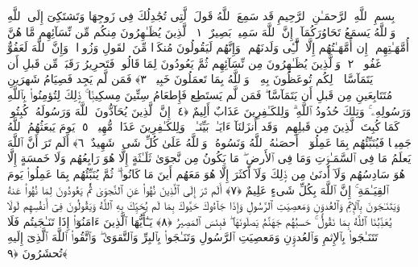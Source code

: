 
  
    
  
    
    

\nopagebreak
  بِسمِ ٱللَّهِ ٱلرَّحمَـٰنِ ٱلرَّحِيمِ
  قَد سَمِعَ ٱللَّهُ قَولَ ٱلَّتِى تُجَٰدِلُكَ فِى زَوجِهَا وَتَشتَكِىٓ إِلَى ٱللَّهِ وَٱللَّهُ يَسمَعُ تَحَاوُرَكُمَآ ۚ إِنَّ ٱللَّهَ سَمِيعٌۢ بَصِيرٌ ﴿١﴾
 ٱلَّذِينَ يُظَـٰهِرُونَ مِنكُم مِّن نِّسَآئِهِم مَّا هُنَّ أُمَّهَـٰتِهِم ۖ إِن أُمَّهَـٰتُهُم إِلَّا ٱلَّٰٓـِٔى وَلَدنَهُم ۚ وَإِنَّهُم لَيَقُولُونَ مُنكَرًۭا مِّنَ ٱلقَولِ وَزُورًۭا ۚ وَإِنَّ ٱللَّهَ لَعَفُوٌّ غَفُورٌۭ ﴿٢﴾
 وَٱلَّذِينَ يُظَـٰهِرُونَ مِن نِّسَآئِهِم ثُمَّ يَعُودُونَ لِمَا قَالُوا۟ فَتَحرِيرُ رَقَبَةٍۢ مِّن قَبلِ أَن يَتَمَآسَّا ۚ ذَٟلِكُم تُوعَظُونَ بِهِۦ ۚ وَٱللَّهُ بِمَا تَعمَلُونَ خَبِيرٌۭ ﴿٣﴾
 فَمَن لَّم يَجِد فَصِيَامُ شَهرَينِ مُتَتَابِعَينِ مِن قَبلِ أَن يَتَمَآسَّا ۖ فَمَن لَّم يَستَطِع فَإِطعَامُ سِتِّينَ مِسكِينًۭا ۚ ذَٟلِكَ لِتُؤمِنُوا۟ بِٱللَّهِ وَرَسُولِهِۦ ۚ وَتِلكَ حُدُودُ ٱللَّهِ ۗ وَلِلكَـٰفِرِينَ عَذَابٌ أَلِيمٌ ﴿٤﴾
 إِنَّ ٱلَّذِينَ يُحَآدُّونَ ٱللَّهَ وَرَسُولَهُۥ كُبِتُوا۟ كَمَا كُبِتَ ٱلَّذِينَ مِن قَبلِهِم ۚ وَقَد أَنزَلنَآ ءَايَـٰتٍۭ بَيِّنَـٰتٍۢ ۚ وَلِلكَـٰفِرِينَ عَذَابٌۭ مُّهِينٌۭ ﴿٥﴾
 يَومَ يَبعَثُهُمُ ٱللَّهُ جَمِيعًۭا فَيُنَبِّئُهُم بِمَا عَمِلُوٓا۟ ۚ أَحصَىٰهُ ٱللَّهُ وَنَسُوهُ ۚ وَٱللَّهُ عَلَىٰ كُلِّ شَىءٍۢ شَهِيدٌ ﴿٦﴾
 أَلَم تَرَ أَنَّ ٱللَّهَ يَعلَمُ مَا فِى ٱلسَّمَـٰوَٟتِ وَمَا فِى ٱلأَرضِ ۖ مَا يَكُونُ مِن نَّجوَىٰ ثَلَـٰثَةٍ إِلَّا هُوَ رَابِعُهُم وَلَا خَمسَةٍ إِلَّا هُوَ سَادِسُهُم وَلَآ أَدنَىٰ مِن ذَٟلِكَ وَلَآ أَكثَرَ إِلَّا هُوَ مَعَهُم أَينَ مَا كَانُوا۟ ۖ ثُمَّ يُنَبِّئُهُم بِمَا عَمِلُوا۟ يَومَ ٱلقِيَـٰمَةِ ۚ إِنَّ ٱللَّهَ بِكُلِّ شَىءٍ عَلِيمٌ ﴿٧﴾
 أَلَم تَرَ إِلَى ٱلَّذِينَ نُهُوا۟ عَنِ ٱلنَّجوَىٰ ثُمَّ يَعُودُونَ لِمَا نُهُوا۟ عَنهُ وَيَتَنَـٰجَونَ بِٱلإِثمِ وَٱلعُدوَٟنِ وَمَعصِيَتِ ٱلرَّسُولِ وَإِذَا جَآءُوكَ حَيَّوكَ بِمَا لَم يُحَيِّكَ بِهِ ٱللَّهُ وَيَقُولُونَ فِىٓ أَنفُسِهِم لَولَا يُعَذِّبُنَا ٱللَّهُ بِمَا نَقُولُ ۚ حَسبُهُم جَهَنَّمُ يَصلَونَهَا ۖ فَبِئسَ ٱلمَصِيرُ ﴿٨﴾
 يَـٰٓأَيُّهَا ٱلَّذِينَ ءَامَنُوٓا۟ إِذَا تَنَـٰجَيتُم فَلَا تَتَنَـٰجَوا۟ بِٱلإِثمِ وَٱلعُدوَٟنِ وَمَعصِيَتِ ٱلرَّسُولِ وَتَنَـٰجَوا۟ بِٱلبِرِّ وَٱلتَّقوَىٰ ۖ وَٱتَّقُوا۟ ٱللَّهَ ٱلَّذِىٓ إِلَيهِ تُحشَرُونَ ﴿٩﴾
